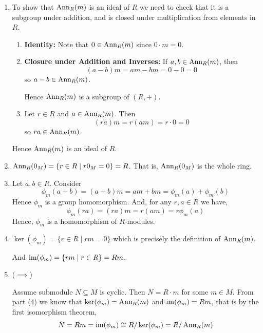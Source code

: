 \documentclass[Notebook.tex]{subfiles}
\begin{document}
    \begin{solution}
        \bbni
        \begin{enumerate}
            \item To show that $\operatorname{\text{Ann}}_R(m)$ is an ideal of $R$ we need to check that it is a subgroup under addition, and is closed under multiplication from elements in $R$. 
            \begin{enumerate}
                \item \textbf{Identity:} Note that $0 \in \operatorname{\text{Ann}}_R(m)$ since $0\cdot m = 0$. 
                \item \textbf{Closure under Addition and Inverses: }If $a,b \in \operatorname{\text{Ann}}_R(m)$, then
                    \[
                    (a-b)m = am - bm = 0 - 0 = 0
                    \]
                    so $a-b \in \operatorname{\text{Ann}}_R(m)$. 
                    
                Hence $\operatorname{\text{Ann}}_R(m)$ is a subgroup of $(R,+)$.

                \item Let $r \in R$ and $a \in \operatorname{\text{Ann}}_R(m)$. Then
                    \[
                    (ra)m = r(am) = r\cdot 0 = 0
                    \]
                    so $ra \in \operatorname{\text{Ann}}_R(m)$. 
            \end{enumerate}
            Hence $\operatorname{\text{Ann}}_R(m)$ is an ideal of $R$. 

            \item $\operatorname{\text{Ann}}_R(0_M) = \{r \in R \mid r0_M = 0\} = R$. That is, $\operatorname{\text{Ann}}_R(0_M)$ is the whole ring. 
            
            \item Let $a, b \in R$. Consider \[\phi_m(a+b) = (a+b)m = am + bm = \phi_m(a) + \phi_m(b)\] Hence $\phi_m$ is a group homomorphism. And, for any $r, a \in R$ we have, 
            \[\phi_m(ra) = (ra)m = r(am) = r\phi_m(a)\] 
            Hence, $\phi_m$ is a homomorphism of $R$-modules. 

            \item $\ker(\phi_m) = \{r \in R \mid rm = 0\}$ which is precisely the definition of $\operatorname{\text{Ann}}_R(m)$. 
            
            And $\operatorname{im}(\phi_m) = \{rm \mid r \in R\} = Rm$. 

            \item ($\implies$)
            
            Assume submodule $N \subseteq M$ is cyclic. Then $N = R \cdot m$ for some $m \in M$. From part (4) we know that $\ker(\phi_m) = \operatorname{\text{Ann}}_R(m)$ and $\operatorname{im}(\phi_m) = Rm$, that is by the first isomorphism theorem, 
            \[N = Rm = \operatorname{im}(\phi_m) \cong R / \ker(\phi_m) = R/\operatorname{\text{Ann}}_R(m)\]


\end{enumerate}
\end{solution}
\end{document}
